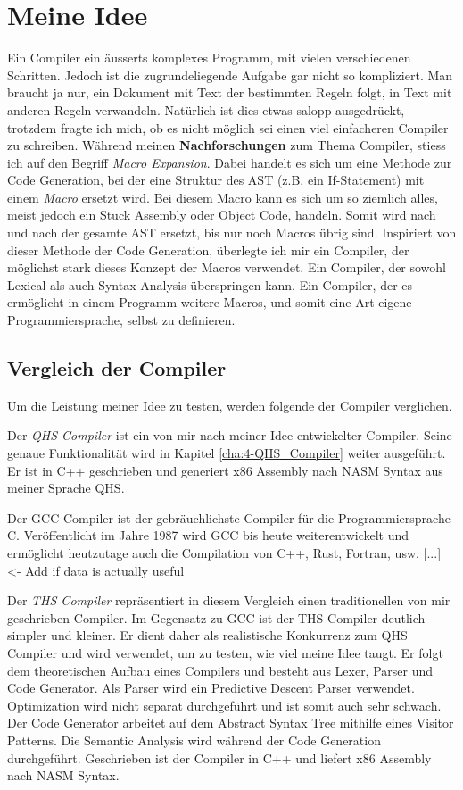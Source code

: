 \chapter{Meine Idee} \label{cha:3-Meine_Idee}
Ein Compiler ein äusserts komplexes Programm, mit vielen verschiedenen Schritten. Jedoch ist die zugrundeliegende Aufgabe gar nicht so kompliziert.
Man braucht ja nur, ein Dokument mit Text der bestimmten Regeln folgt, in Text mit anderen Regeln verwandeln. Natürlich ist dies etwas salopp ausgedrückt, trotzdem fragte ich mich,
ob es nicht möglich sei einen viel einfacheren Compiler zu schreiben. Während meinen \textbf{Nachforschungen} zum Thema Compiler, stiess ich auf den Begriff \textit{Macro Expansion}.
Dabei handelt es sich um eine Methode zur Code Generation, bei der eine Struktur des AST (z.B. ein If-Statement) mit einem \textit{Macro} ersetzt wird. Bei diesem Macro kann es sich um so ziemlich alles,
meist jedoch ein Stuck Assembly oder Object Code, handeln. Somit wird nach und nach der gesamte AST ersetzt, bis nur noch Macros übrig sind. Inspiriert von dieser Methode der Code Generation,
überlegte ich mir ein Compiler, der möglichst stark dieses Konzept der Macros verwendet. Ein Compiler, der sowohl Lexical als auch Syntax Analysis überspringen kann.
Ein Compiler, der es ermöglicht in einem Programm weitere Macros, und somit eine Art eigene Programmiersprache, selbst zu definieren.

\section{Vergleich der Compiler}
Um die Leistung meiner Idee zu testen, werden folgende der Compiler verglichen.

Der \textit{QHS Compiler} ist ein von mir nach meiner Idee entwickelter Compiler. Seine genaue Funktionalität wird in Kapitel \ref{cha:4-QHS_Compiler} weiter ausgeführt.
Er ist in C++ geschrieben und generiert x86 Assembly nach NASM Syntax aus meiner Sprache QHS.

Der GCC Compiler ist der gebräuchlichste Compiler für die Programmiersprache C. Veröffentlicht im Jahre 1987 wird GCC bis heute weiterentwickelt und ermöglicht heutzutage auch die Compilation von C++, Rust, Fortran, usw.
[...] <- Add if data is actually useful

Der \textit{THS Compiler} repräsentiert in diesem Vergleich einen traditionellen von mir geschrieben Compiler. Im Gegensatz zu GCC ist der THS Compiler deutlich simpler und kleiner.
Er dient daher als realistische Konkurrenz zum QHS Compiler und wird verwendet, um zu testen, wie viel meine Idee taugt. Er folgt dem theoretischen Aufbau eines Compilers und besteht aus Lexer, Parser und Code Generator.
Als Parser wird ein Predictive Descent Parser verwendet. Optimization wird nicht separat durchgeführt und ist somit auch sehr schwach. Der Code Generator arbeitet auf dem Abstract Syntax Tree mithilfe eines Visitor Patterns.
Die Semantic Analysis wird während der Code Generation durchgeführt. Geschrieben ist der Compiler in C++ und liefert x86 Assembly nach NASM Syntax.



